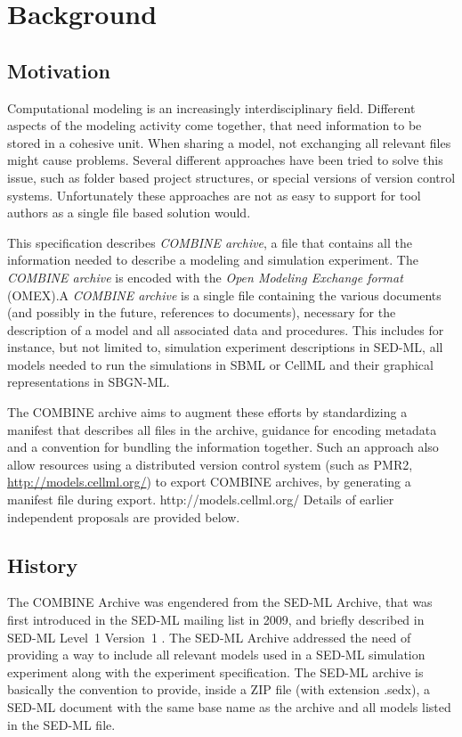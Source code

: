 
\section{Background}  \label{background} 

\subsection{Motivation}

Computational modeling is an increasingly interdisciplinary field. Different aspects of the modeling activity come together, that need information to be stored in a cohesive unit. When sharing a model, not exchanging all relevant files might cause problems. Several different approaches have been tried to solve this issue, such as folder based project structures, or special versions of version control systems. Unfortunately these approaches are not as easy to support for tool authors as a single file based solution would. 

This specification describes \textit{COMBINE archive}, a file that contains all the information needed to describe a modeling and simulation experiment. The \textit{COMBINE archive} is encoded with the \emph{Open Modeling Exchange format} (OMEX).A \textit{COMBINE archive} is a single file containing the various documents (and possibly in the future, references to documents), necessary for the description of a model and all associated data and procedures. This includes for instance, but not limited to, simulation experiment descriptions in SED-ML, all models needed to run the simulations in SBML or CellML
and their graphical representations in SBGN-ML. 

The COMBINE archive aims to augment these efforts by standardizing a manifest that describes all files in the archive, guidance for encoding metadata and a convention for bundling the information together. Such an approach also allow resources using a distributed version control system (such as PMR2, \url{http://models.cellml.org/}) to export COMBINE archives, by generating a manifest file during export. 
http://models.cellml.org/
Details of earlier independent proposals are provided below. 

\subsection{History}

The COMBINE Archive was engendered from the SED-ML Archive, that was first introduced in the SED-ML mailing list in 2009, and briefly described in SED-ML Level~1 Version~1 \citep{Waltemath:2011}. The SED-ML Archive addressed the need of providing a way to include all relevant models used in a SED-ML simulation experiment along with the experiment specification. The SED-ML archive is basically the convention to provide, inside a ZIP file (with extension .sedx), a SED-ML document with the same base name as the archive and all models listed in the SED-ML file. 

